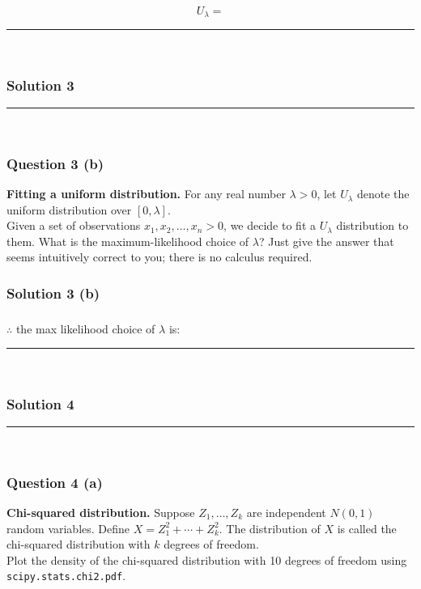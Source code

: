 \documentclass{article}
\begin{document}
$$U_{\lambda} = $$

\noindent\rule{\textwidth}{0.4pt}\\

\newpage

\subsubsection*{Solution 3}
\noindent\rule{\textwidth}{0.4pt}\\
\subsubsection*{Question 3 (b)}
\begin{flushleft}
    \textbf{Fitting a uniform distribution.} For any real number $\lambda > 0$, let $U_{\lambda}$ denote the uniform distribution over $[0, \lambda]$. \\
    Given a set of observations $x_{1}, x_{2}, \ldots, x_{n} > 0$, we decide to fit a $U_{\lambda}$ distribution to them. What is the maximum-likelihood choice of $\lambda$? Just give the answer that seems intuitively correct to you; there is no calculus required.
\end{flushleft}
\subsubsection*{Solution 3 (b)}

\subsubsection*{\normalfont}{$\therefore$ the max likelihood choice of ${\lambda}$ is:}

\noindent\rule{\textwidth}{0.4pt}\\

\newpage

\subsubsection*{Solution 4}
\noindent\rule{\textwidth}{0.4pt}\\
\subsubsection*{Question 4 (a)}
\begin{flushleft}
    \textbf{Chi-squared distribution.} Suppose $Z_{1}, \ldots, Z_{k}$ are independent $N(0,1)$ random variables. Define $X = Z_{1}^{2} + \cdots + Z_{k}^{2}$. The distribution of $X$ is called the chi-squared distribution with $k$ degrees of freedom.\\
    Plot the density of the chi-squared distribution with 10 degrees of freedom using \texttt{scipy.stats.chi2.pdf}.
\end{flushleft}
\end{document}
